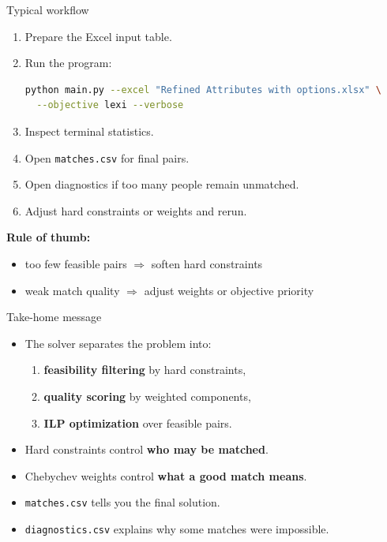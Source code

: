 \documentclass[aspectratio=169]{beamer}
\begin{document}
\begin{frame}[fragile]{Typical workflow}
\begin{enumerate}
  \item Prepare the Excel input table.
  \item Run the program:
\begin{lstlisting}[language=bash]
python main.py --excel "Refined Attributes with options.xlsx" \
  --objective lexi --verbose
\end{lstlisting}
  \item Inspect terminal statistics.
  \item Open \texttt{matches.csv} for final pairs.
  \item Open diagnostics if too many people remain unmatched.
  \item Adjust hard constraints or weights and rerun.
\end{enumerate}

\vspace{0.4em}
\textbf{Rule of thumb:}
\begin{itemize}
  \item too few feasible pairs $\Rightarrow$ soften hard constraints
  \item weak match quality $\Rightarrow$ adjust weights or objective priority
\end{itemize}
\end{frame}

\begin{frame}{Take-home message}
\begin{itemize}
  \item The solver separates the problem into:
  \begin{enumerate}
    \item \textbf{feasibility filtering} by hard constraints,
    \item \textbf{quality scoring} by weighted components,
    \item \textbf{ILP optimization} over feasible pairs.
  \end{enumerate}
  \item Hard constraints control \textbf{who may be matched}.
  \item Chebychev weights control \textbf{what a good match means}.
  \item \texttt{matches.csv} tells you the final solution.
  \item \texttt{diagnostics.csv} explains why some matches were impossible.
\end{itemize}
\end{frame}
\end{document}
